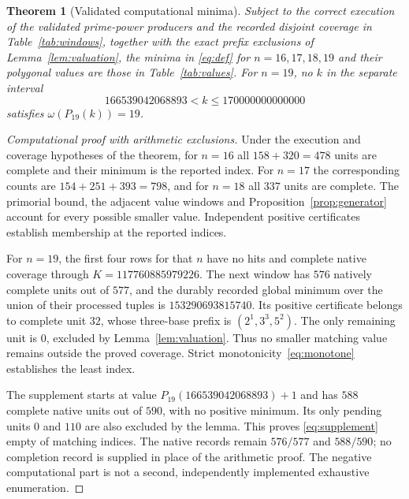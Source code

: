 \documentclass[11pt]{article}
\newtheorem{theorem}{Theorem}
\theoremstyle{remark}
\begin{document}
\begin{theorem}[Validated computational minima]\label{thm:main}
Subject to the correct execution of the validated prime-power producers
and the recorded disjoint coverage in Table~\ref{tab:windows}, together with
the exact prefix exclusions of Lemma~\ref{lem:valuation}, the minima in
\eqref{eq:def} for $n=16,17,18,19$ and their polygonal values are those in
Table~\ref{tab:values}. For $n=19$, no $k$ in the separate interval
\begin{equation}\label{eq:supplement}
 166539042068893<k\leq170000000000000
\end{equation}
satisfies $\omega(P_{19}(k))=19$.
\end{theorem}
\begin{proof}[Computational proof with arithmetic exclusions]
Under the execution and coverage hypotheses of the theorem, for $n=16$
all $158+320=478$ units are complete and their minimum is the
reported index. For $n=17$ the corresponding counts are
$154+251+393=798$, and for $n=18$ all $337$ units are complete. The
primorial bound, the adjacent value windows and
Proposition~\ref{prop:generator} account for every possible smaller value.
Independent positive certificates establish membership at the reported
indices.

For $n=19$, the first four rows for that $n$ have no hits and complete
native coverage through $K=117760885979226$. The next window has $576$
natively complete units out of $577$, and the durably recorded global
minimum over the union of their processed tuples is $153290693815740$. Its positive
certificate belongs to complete unit $32$, whose three-base prefix is
$(2^1,3^3,5^2)$. The only remaining unit is $0$, excluded by
Lemma~\ref{lem:valuation}. Thus no smaller matching value remains outside
the proved coverage. Strict monotonicity~\eqref{eq:monotone} establishes
the least index.

The supplement starts at value $P_{19}(166539042068893)+1$ and has $588$
complete native units out of $590$, with no positive minimum. Its only
pending units $0$ and $110$ are also excluded by the lemma. This proves
\eqref{eq:supplement} empty of matching indices. The native records remain
$576/577$ and $588/590$; no completion record is supplied in place of the
arithmetic proof. The negative computational part is not a second,
independently implemented exhaustive enumeration.
\end{proof}
\end{document}
